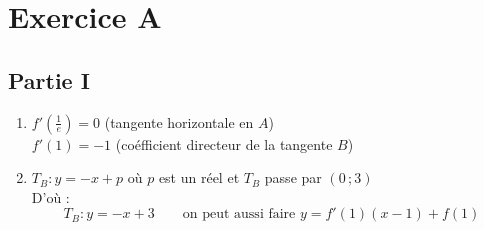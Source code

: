 \documentclass{scrartcl}
\begin{document}
    \section*{Exercice A}
    \begin{adjustwidth}{2em}{0pt}
        \subsection*{Partie I}
        \begin{enumerate}
            \item	$f'\left(\frac{1}{e}\right)=0$ (tangente horizontale en $A$) \\ $f'(1)=-1$ (coéfficient directeur de la tangente $B$)
            \item   $T_B:y=-x+p$ où $p$ est un réel et $T_B$ passe par $(0\,;3)$ \\ D'où : \[\boxed{T_B:y=-x+3} \qquad \text{on peut aussi faire }y=f'(1)(x-1)+f(1)\]
        \end{enumerate}

        \pagebreak


\end{adjustwidth}
\end{document}
